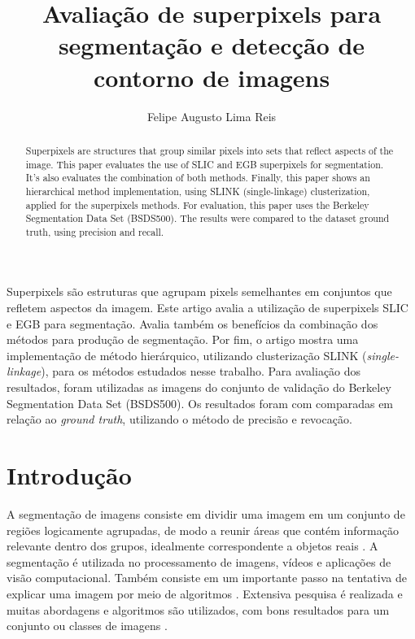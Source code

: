 \title{Avaliação de superpixels para segmentação e detecção de contorno de imagens}
\author{Felipe Augusto Lima Reis\inst{1}}
\begin{document}
 

\maketitle

\begin{abstract}
  Superpixels are structures that group similar pixels into sets that reflect aspects of the image. This paper evaluates the use of SLIC and EGB superpixels for segmentation. It's also evaluates the combination of both methods. Finally, this paper shows an hierarchical method implementation, using SLINK (single-linkage) clusterization, applied for the superpixels methods. For evaluation, this paper uses the Berkeley Segmentation Data Set (BSDS500). The results were compared to the dataset ground truth, using precision and recall.
\end{abstract}
     
\begin{resumo} 
  Superpixels são estruturas que agrupam pixels semelhantes em conjuntos que refletem aspectos da imagem. Este artigo avalia a utilização de superpixels SLIC e EGB para segmentação. Avalia também os benefícios da combinação dos métodos para produção de segmentação. Por fim, o artigo mostra uma implementação de método hierárquico, utilizando clusterização SLINK (\textit{single-linkage}), para os métodos estudados nesse trabalho. Para avaliação dos resultados, foram utilizadas as imagens do conjunto de validação do Berkeley Segmentation Data Set (BSDS500). Os resultados foram com comparadas em relação ao \textit{ground truth}, utilizando o método de precisão e revocação.
\end{resumo}


\section{Introdução} \label{sec:introducao}

A segmentação de imagens consiste em dividir uma imagem em um conjunto de regiões logicamente agrupadas, de modo a reunir áreas que contém informação relevante dentro dos grupos, idealmente correspondente a objetos reais \cite{DOMINGUEZ} \cite{ZHANG2008}. A segmentação é utilizada no processamento de imagens, vídeos e aplicações de visão computacional. Também consiste em um importante passo na tentativa de explicar uma imagem por meio de algoritmos \cite{ZHANG2008}. Extensiva pesquisa é realizada e muitas abordagens e algoritmos são utilizados, com bons resultados para um conjunto ou classes de imagens \cite{ZHANG2008}. 
\end{document}
